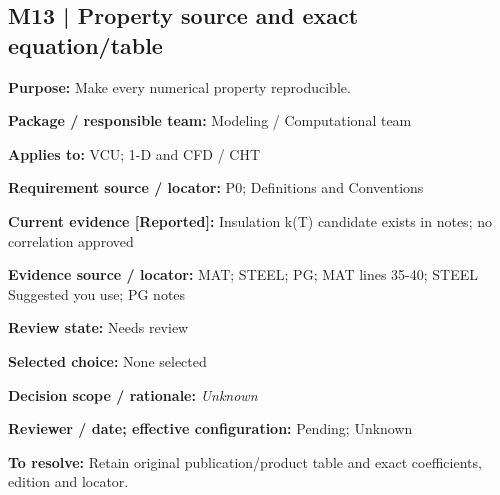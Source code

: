 \documentclass[11pt]{article}
\begin{document}
\par\noindent\begin{minipage}{\textwidth}\small\setlength{\parskip}{2pt}
\subsection*{M13 | Property source and exact equation/table}
\textbf{Purpose:} Make every numerical property reproducible.\par
\textbf{Package / responsible team:} Modeling / Computational team\par
\textbf{Applies to:} VCU; 1-D and CFD / CHT\par
\textbf{Requirement source / locator:} P0; Definitions and Conventions\par
\textbf{Current evidence [Reported]:} Insulation k(T) candidate exists in notes; no correlation approved\par
\textbf{Evidence source / locator:} MAT; STEEL; PG; MAT lines 35-40; STEEL Suggested you use; PG notes\par
\textbf{Review state:} Needs review\par
\textbf{Selected choice:} None selected\par
\textbf{Decision scope / rationale:} \textit{Unknown}\par
\textbf{Reviewer / date; effective configuration:} Pending; Unknown\par
\textbf{To resolve:} Retain original publication/product table and exact coefficients, edition and locator.\par
\end{minipage}\par\vspace{5pt}
\end{document}
